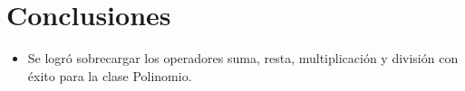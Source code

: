 \documentclass[11pt]{article}
\begin{document}
\section{Conclusiones}
\begin{itemize}
\item Se logr\'o sobrecargar los operadores suma, resta, multiplicaci\'on y divisi\'on con \'exito para la clase Polinomio.
\end{itemize}
\end{document}
